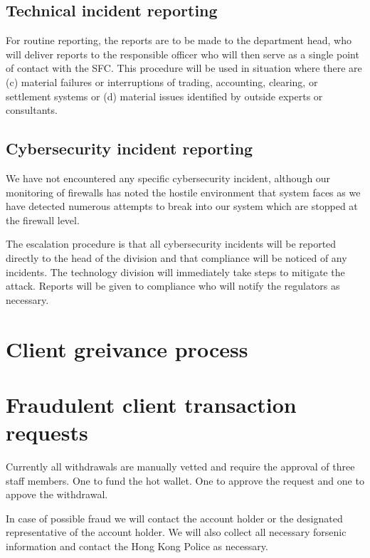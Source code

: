 \subsection{Technical incident reporting}

For routine reporting, the reports are to be made to the department
head, who will deliver reports to the responsible officer who will
then serve as a single point of contact with the SFC.  This procedure
will be used in situation where there are (c) material failures or
interruptions of trading, accounting, clearing, or settlement systems
or (d) material issues identified by outside experts or consultants.

\subsection{Cybersecurity incident reporting}

We have not encountered any specific cybersecurity incident, although
our monitoring of firewalls has noted the hostile environment that
system faces as we have detected numerous attempts to break into our
system which are stopped at the firewall level.

The escalation procedure is that all cybersecurity incidents will be
reported directly to the head of the division and that compliance will
be noticed of any incidents.  The technology division will immediately
take steps to mitigate the attack.  Reports will be given to
compliance who will notify the regulators as necessary.



\section{Client greivance process}

\section{Fraudulent client transaction requests}
Currently all withdrawals are manually vetted and require the approval
of three staff members.  One to fund the hot wallet.  One to approve
the request and one to appove the withdrawal.

In case of possible fraud we will contact the account holder or the
designated representative of the account holder.  We will also collect
all necessary forsenic information and contact the Hong Kong Police as
necessary.


